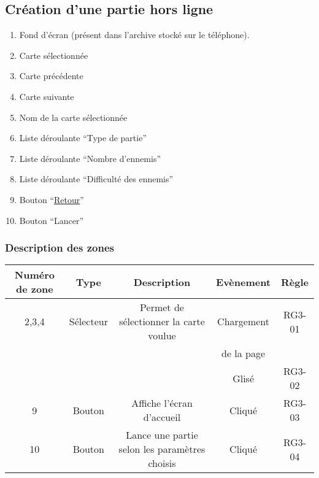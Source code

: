 \documentclass{report}
\begin{document}
	\subsection{Création d'une partie hors ligne}
	
		\hypertarget{Creer partie solo}{}
		\label{Creer partie solo}

		\begin{center}
					
		\end{center}
		
		\begin{enumerate}
		  \item Fond d'écran (présent dans l'archive stocké sur le téléphone).
		  \item Carte sélectionnée
		  \item Carte précédente
		  \item Carte suivante
		  \item Nom de la carte sélectionnée
		  \item Liste déroulante ``Type de partie''
		  \item Liste déroulante ``Nombre d'ennemis''
		  \item Liste déroulante ``Difficulté des ennemis''
		  \item Bouton ``\hyperlink{Accueil}{Retour}''
		  \item Bouton ``Lancer'' 
		\end{enumerate}
		
		\subsubsection{Description des zones}
		
			\begin{tabular}{|c|c|c|c|c|} \hline
				Numéro de zone & Type  & Description & Evènement &	Règle \\\hline
				2,3,4 & Sélecteur & Permet de sélectionner la carte voulue & Chargement & RG3-01 \\
				      &           &                                        & de la page & \\
				      &           &                                        & Glisé    & RG3-02 \\\hline
				9 & Bouton & Affiche l'écran d'accueil & Cliqué & RG3-03 \\\hline
				10& Bouton & Lance une partie selon les paramètres choisis & Cliqué & RG3-04 \\\hline
			\end{tabular}
\end{document}
